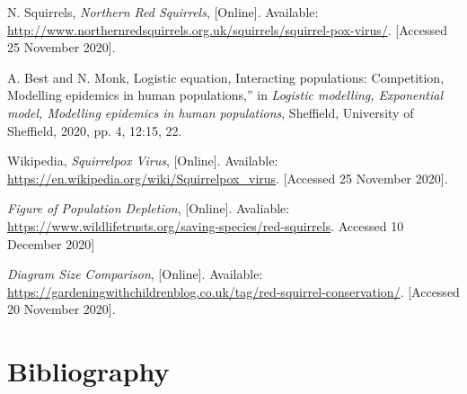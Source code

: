 \documentclass{article}
\begin{document}
\begin{enumerate}[label={[\arabic*]}]
\item N. Squirrels, \emph{Northern Red Squirrels}, [Online]. Available: \url{http://www.northernredsquirrels.org.uk/squirrels/squirrel-pox-virus/}. [Accessed 25 November 2020].
\item A. Best and N. Monk, Logistic equation, Interacting populations: Competition, Modelling epidemics in human populations,” in \emph{Logistic modelling, Exponential model, Modelling epidemics in human populations}, Sheffield, University of Sheffield, 2020, pp. 4, 12:15, 22.
\item Wikipedia, \emph{Squirrelpox Virus}, [Online]. Available: \url{https://en.wikipedia.org/wiki/Squirrelpox_virus}. [Accessed 25 November 2020].
\item \emph{Figure of Population Depletion}, [Online]. Avaliable: \url{https://www.wildlifetrusts.org/saving-species/red-squirrels}. Accessed 10 December 2020] 
\item \emph{Diagram Size Comparison}, [Online]. Available: \url{https://gardeningwithchildrenblog.co.uk/tag/red-squirrel-conservation/}. [Accessed 20 November 2020].

\end{enumerate}




\section{Bibliography}
\end{document}
